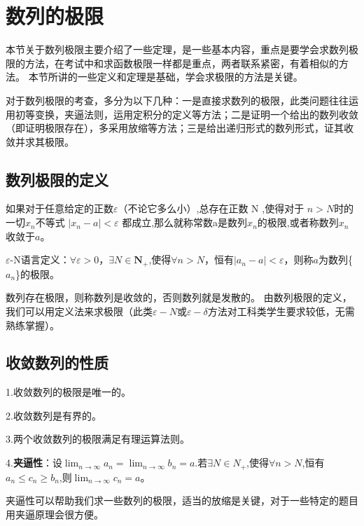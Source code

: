 \chapter{数列的极限}

本节关于数列极限主要介绍了一些定理，是一些基本内容，重点是要学会求数列极限的方法，在考试中和求函数极限一样都是重点，两者联系紧密，有着相似的方法。
本节所讲的一些定义和定理是基础，学会求极限的方法是关键。

对于数列极限的考查，多分为以下几种：一是直接求数列的极限，此类问题往往运用初等变换，夹逼法则，运用定积分的定义等方法；二是证明一个给出的数列收敛（即证明极限存在），多采用放缩等方法；三是给出递归形式的数列形式，证其收敛并求其极限。

\section{数列极限的定义}
\begin{definition}
	如果对于任意给定的正数$\varepsilon$（不论它多么小）,总存在正数 N ,使得对于 $n>N $时的一切$x_n $不等式 $|x_n-a| < \varepsilon$ 都成立,那么就称常数a是数列$x_n$的极限,或者称数列$x_n$收敛于$a$。
\end{definition}

$\varepsilon$-N语言定义：$\forall \varepsilon>0$，$\exists N \in \textbf{N}_+$,使得$\forall n >N$，恒有$|a_n-a|<\varepsilon$，则称$a$为数列\{$a_n$\}的极限。

数列存在极限，则称数列是收敛的，否则数列就是发散的。
由数列极限的定义，我们可以用定义法来求极限（此类$\varepsilon-N$或$\varepsilon-\delta$方法对工科类学生要求较低，无需熟练掌握）。

\section{收敛数列的性质}

1.收敛数列的极限是唯一的。

2.收敛数列是有界的。

3.两个收敛数列的极限满足有理运算法则。

4.\textbf{夹逼性}：设$\lim_{n \to \infty}a_n=\lim_{n \to \infty}b_n=a$.若$\exists N \in N_+$,使得$\forall n>N$,恒有$a_n \leq c_n \geq b_n$,则$\lim_{n \to \infty}c_n=a$。

夹逼性可以帮助我们求一些数列的极限，适当的放缩是关键，对于一些特定的题目用夹逼原理会很方便。

